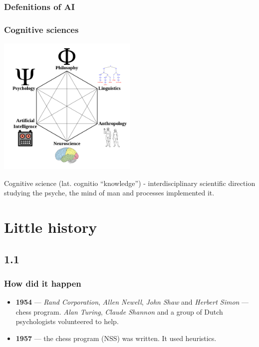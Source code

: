 \documentclass[default]{beamer}
\begin{document}
	\begin{frame}
		\frametitle{Defenitions of AI}
		
		\begin{itemize}
		\end{itemize}
		\end{frame}
		
		
		\begin{frame}
		\frametitle{Cognitive sciences}
		
		
		\centering
		\includegraphics[width=0.5\textwidth]{cogsci.png}
		
		Cognitive science (lat. cognitio ``knowledge'') - interdisciplinary scientific direction studying the psyche, the mind of man and processes implemented it.
	\end{frame}

	\section{Little history}
	\subsection{1.1}
	\begin{frame}
		\frametitle{How did it happen}

		\begin{itemize}
			\item \textbf{1954} --- \textit{Rand Corporation}, \textit{Allen Newell}, \textit{John Shaw} and \textit{Herbert Simon}  --- chess program. \textit{Alan Turing}, \textit{Claude Shannon} and a group of Dutch psychologists volunteered to help.
			\item \textbf{1957} --- the chess program (NSS) was written. It used heuristics.
		\end{itemize}
	\end{frame}
\end{document}
